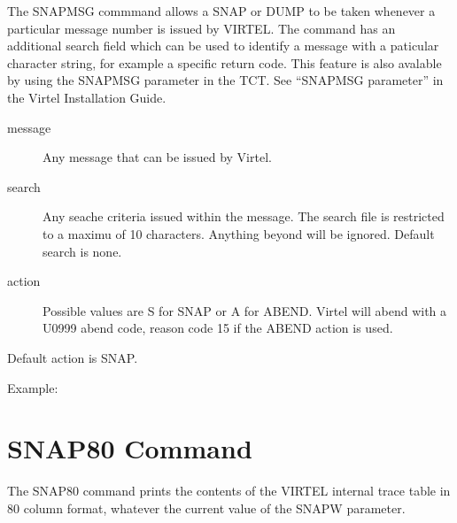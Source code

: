 \documentclass[letterpaper,10pt,english]{sphinxmanual}
\begin{document}
The SNAPMSG commmand allows a SNAP or DUMP to be taken whenever a particular message number is issued by VIRTEL. The command has an additional search field which can be used to identify a message with a paticular character string, for example a specific return code. This feature is also avalable by using the SNAPMSG parameter in the TCT. See “SNAPMSG parameter” in the Virtel Installation Guide.
\begin{description}
\item[{message}] \leavevmode
Any message that can be issued by Virtel.

\item[{search}] \leavevmode
Any seache criteria issued within the message. The search file is restricted to a maximu of 10 characters. Anything beyond will be ignored. Default search is none.

\item[{action}] \leavevmode
Possible values are S for SNAP or A for ABEND. Virtel will abend with a U0999 abend code, reason code 15 if the ABEND action is used.

\end{description}

Default action is SNAP.

Example:

\begin{sphinxVerbatim}[commandchars=\\\{\}]
 
\end{sphinxVerbatim}

\ignorespaces 

\section{SNAP80 Command}
\label{\detokenize{audit_operations_ and_performance:snap80-command}}\label{\detokenize{audit_operations_ and_performance:index-21}}
\begin{sphinxVerbatim}[commandchars=\\\{\}]
\end{sphinxVerbatim}

The SNAP80 command prints the contents of the VIRTEL internal trace table in 80 column format, whatever the current value of the SNAPW parameter.
\end{document}
